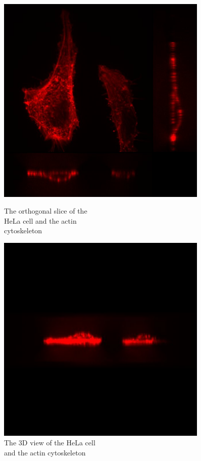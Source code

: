 \documentclass[a4paper,english,12pt,bibliography=totoc]{scrreprt}
\begin{document}
\begin{figure}[htbp]
    \begin{minipage}[t]{0.5\linewidth}
        \centering
        \includegraphics[width=0.9\textwidth]{Images/Actins/Orthogonal_slice_view.jpg}
        \caption{The orthogonal slice of the\\ HeLa cell and the actin \\cytoskeleton}
    \end{minipage}%
    \begin{minipage}[t]{0.5\linewidth}
        \centering
        \includegraphics[width=0.9\textwidth]{Images/Actins/zscan 3D View.jpg}
        \caption{The 3D view of the HeLa cell \\and the actin cytoskeleton}
    \end{minipage}
\end{figure}
\end{document}
